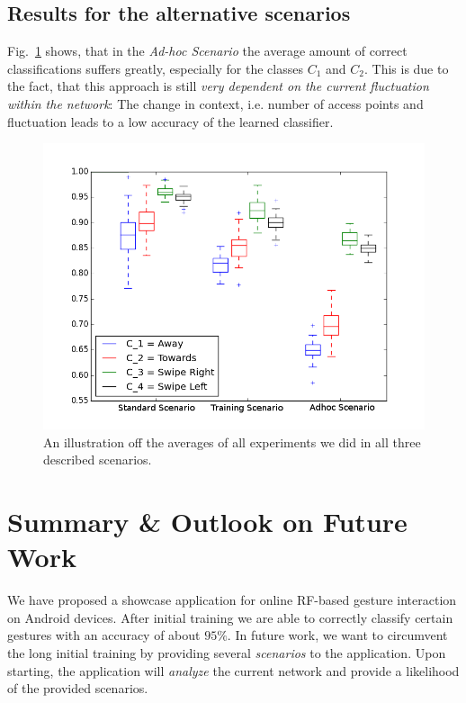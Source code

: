 \documentclass[conference]{IEEEtran}
\begin{document}
\subsection{Results for the alternative scenarios}
Fig.~\ref{res:mean} shows, that in the \emph{Ad-hoc Scenario} the average amount of correct classifications suffers greatly, especially for the classes $C_1$ and $C_2$. This is due to the fact, that this approach is still \emph{very dependent on the current fluctuation within the network}:
The change in context, i.e. number of access points and fluctuation leads to a low accuracy of the learned classifier.


\begin{figure}[tb]
\centering
\includegraphics[width=0.85\columnwidth]{./pics/boxcompare}
\caption{An illustration off the averages of all experiments we did in all three described scenarios.}
\label{res:mean}
\end{figure}
%
% 
% 
\section{Summary \& Outlook on Future Work}
We have proposed a showcase application for online RF-based gesture interaction on Android devices. After initial training we are able to correctly classify certain gestures with an accuracy of about $95\%$.
In future work, we want to circumvent the long initial training by providing several \emph{scenarios} to the application. Upon starting, the application will \emph{analyze} the current network and provide a likelihood of the provided scenarios. 
%


%
\end{document}
